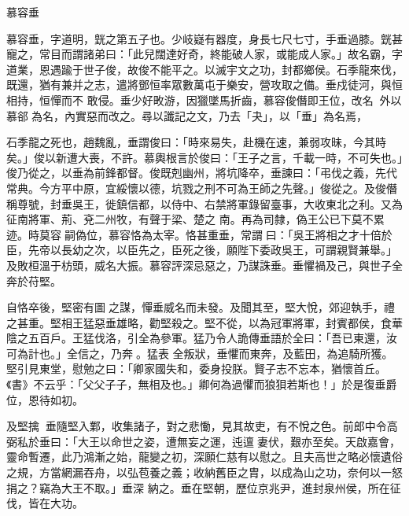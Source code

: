 
\begin{pinyinscope}

 慕容垂



 慕容垂，字道明，皝之第五子也。少岐嶷有器度，身長七尺七寸，手垂過膝。皝甚寵之，常目而謂諸弟曰：「此兒闊達好奇，終能破人家，或能成人家。」故名霸，字道業，恩遇踰于世子俊，故俊不能平之。以滅宇文之功，封都鄉侯。石季龍來伐，既還，猶有兼并之志，遣將鄧恒率眾數萬屯于樂安，營攻取之備。垂戍徒河，與恒相持，恒憚而不
 敢侵。垂少好畋游，因獵墜馬折齒，慕容俊僭即王位，改名，外以慕郤為名，內實惡而改之。尋以讖記之文，乃去「夬」，以「垂」為名焉，



 石季龍之死也，趙魏亂，垂謂俊曰：「時來易失，赴機在速，兼弱攻昧，今其時矣。」俊以新遭大喪，不許。慕輿根言於俊曰：「王子之言，千載一時，不可失也。」俊乃從之，以垂為前鋒都督。俊既剋幽州，將坑降卒，垂諫曰：「弔伐之義，先代常典。今方平中原，宜綏懷以德，坑戮之刑不可為王師之先聲。」俊從之。及俊僭稱尊號，封垂吳王，徙鎮信都，以侍中、右禁將軍錄留臺事，大收東北之利。又為征南將軍、荊、兗二州牧，有聲于梁、楚之
 南。再為司隸，偽王公已下莫不累迹。時莫容嗣偽位，慕容恪為太宰。恪甚重垂，常謂曰：「吳王將相之才十倍於臣，先帝以長幼之次，以臣先之，臣死之後，願陛下委政吳王，可謂親賢兼舉。」及敗桓溫于枋頭，威名大振。慕容評深忌惡之，乃謀誅垂。垂懼禍及己，與世子全奔於苻堅。



 自恪卒後，堅密有圖之謀，憚垂威名而未發。及聞其至，堅大悅，郊迎執手，禮之甚重。堅相王猛惡垂雄略，勸堅殺之。堅不從，以為冠軍將軍，封賓都侯，食華陰之五百戶。王猛伐洛，引全為參軍。猛乃令人詭傳垂語於全曰：「吾已東還，汝可為計也。」全信之，乃奔。猛表
 全叛狀，垂懼而東奔，及藍田，為追騎所獲。堅引見東堂，慰勉之曰：「卿家國失和，委身投朕。賢子志不忘本，猶懷首丘。《書》不云乎：「父父子子，無相及也。」卿何為過懼而狼狽若斯也！」於是復垂爵位，恩待如初。



 及堅擒，垂隨堅入鄴，收集諸子，對之悲慟，見其故吏，有不悅之色。前郎中令高弼私於垂曰：「大王以命世之姿，遭無妄之運，迍邅妻伏，艱亦至矣。天啟嘉會，靈命暫遷，此乃鴻漸之始，龍變之初，深願仁慈有以慰之。且夫高世之略必懷遺俗之規，方當網漏吞舟，以弘苞養之義；收納舊臣之胄，以成為山之功，奈何以一怒捐之？竊為大王不取。」垂深
 納之。垂在堅朝，歷位京兆尹，進封泉州侯，所在征伐，皆在大功。




\end{pinyinscope}

